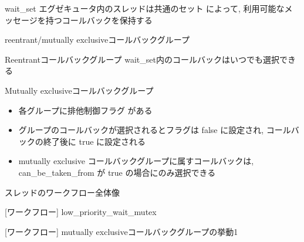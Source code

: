 \begin{frame}{wait\_set}
    エグゼキュータ内のスレッドは共通のセット  によって, 利用可能なメッセージを持つコールバックを保持する
\end{frame}

\begin{frame}{reentrant/mutually exclusiveコールバックグループ}
    \begin{block}{Reentrantコールバックグループ}
        wait\_set内のコールバックはいつでも選択できる
    \end{block}
    \begin{block}{Mutually exclusiveコールバックグループ}
        \setlength{\linewidth}{0.98\columnwidth}
        \begin{itemize}
            \item 各グループに排他制御フラグ  がある
            \item グループのコールバックが選択されるとフラグは false に設定され, コールバックの終了後に true に設定される
            \item mutually exclusive コールバックグループに属すコールバックは,  can\_be\_taken\_from が true の場合にのみ選択できる
        \end{itemize}
    \end{block}
\end{frame}

\begin{frame}{スレッドのワークフロー全体像}
\end{frame}

\begin{frame}{[ワークフロー] low\_priority\_wait\_mutex}
\end{frame}

\begin{frame}{[ワークフロー] mutually exclusiveコールバックグループの挙動1}
\end{frame}

